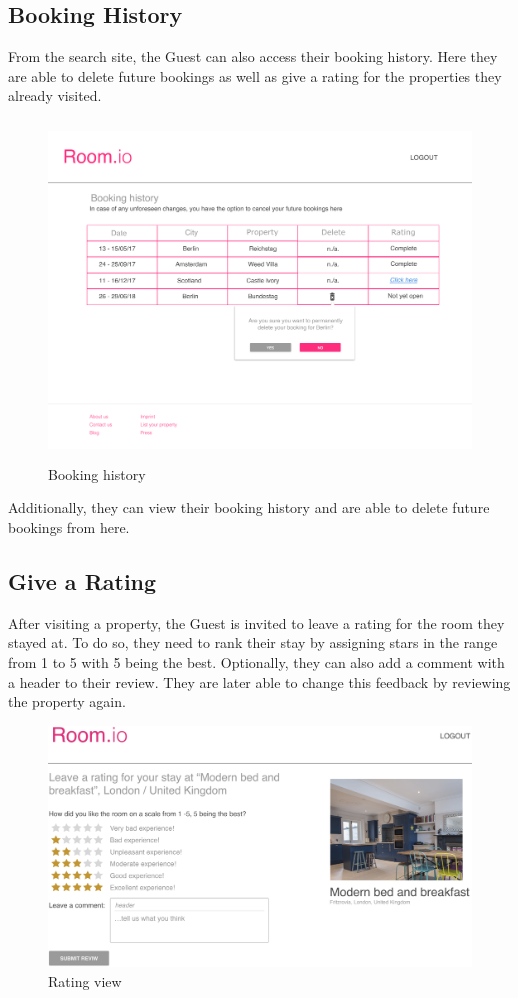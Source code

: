 \subsection{Booking History}
From the search site, the Guest can also access their booking history. Here they are able to delete future bookings as well as give a rating for the properties they already visited.

\begin{figure}[H]
  \centering
  \includegraphics[height=9cm]{img/mockups/guest_bookinghistory.pdf}
  \caption{Booking history}
  \label{Booking_History_View}
\end{figure}

Additionally, they can view their booking history and are able to delete future bookings from here.

\subsection{Give a Rating}
After visiting a property, the Guest is invited to leave a rating for the room they stayed at. To do so, they need to rank their stay by assigning stars in the range from 1 to 5 with 5 being the best. Optionally, they can also add a comment with a header to their review. They are later able to change this feedback by reviewing the property again. 

\begin{figure}[H]
  \centering
  \includegraphics[width=17cm]{img/mockups/guest_rating.png}
  \caption{Rating view}
  \label{Rating_View}
\end{figure}

